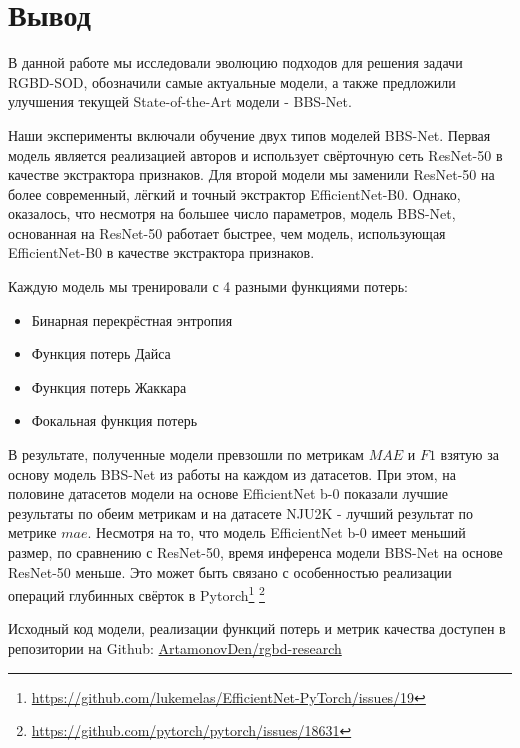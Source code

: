 \section{Вывод}


В данной работе мы исследовали эволюцию подходов для решения задачи RGBD-SOD, обозначили самые актуальные модели,
а также предложили улучшения текущей State-of-the-Art модели - BBS-Net\cite{BBS}.

Наши эксперименты включали обучение двух типов моделей BBS-Net. Первая модель является реализацией авторов \cite{BBS} и
использует свёрточную сеть ResNet-50\cite{ResNet} в качестве экстрактора признаков. Для второй модели мы заменили ResNet-50 на более
современный, лёгкий и точный экстрактор EfficientNet-B0\cite{Efficientnet}. Однако, оказалось, что несмотря на большее число параметров, модель BBS-Net,
основанная на ResNet-50 работает быстрее, чем модель, использующая EfficientNet-B0 в качестве экстрактора признаков.

Каждую модель мы тренировали с 4 разными функциями потерь:
\begin{itemize}
    \item Бинарная перекрёстная энтропия \cite{CE}
    \item Функция потерь Дайса\cite{Dice-Loss}
    \item Функция потерь Жаккара\cite{IoU-Loss}
    \item Фокальная функция потерь \cite{Focal-Loss}
\end{itemize}

В результате, полученные модели превзошли по метрикам $MAE$ и $F1$ взятую за основу модель BBS-Net из работы \cite{BBS}
на каждом из датасетов. При этом, на половине датасетов модели на основе EfficientNet b-0 показали
лучшие результаты по обеим метрикам и на датасете NJU2K - лучший результат по метрике $mae$.
Несмотря на то, что модель EfficientNet b-0 имеет меньший размер, по сравнению с ResNet-50, время инференса
модели BBS-Net на основе ResNet-50 меньше. Это может быть связано с особенностью реализации операций глубинных свёрток в Pytorch\footnote{\url{https://github.com/lukemelas/EfficientNet-PyTorch/issues/19}}
\footnote{\url{https://github.com/pytorch/pytorch/issues/18631}}

Исходный код модели, реализации функций потерь и метрик качества доступен в репозитории на Github: \href{https://github.com/ArtamonovDen/rgbd-research}{ArtamonovDen/rgbd-research}